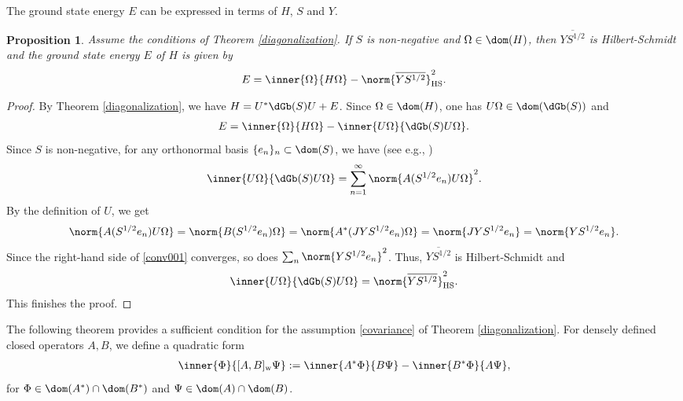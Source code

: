\documentclass[12pt,draft]{article}
\theoremstyle{plain}
\newtheorem{prop}[theorem]{\bf Proposition}
\numberwithin{equation}{section}
\theoremstyle{remark}
\begin{document}
The ground state energy $E$ can be expressed in terms of $H$, $S$ and $Y$.
\begin{prop}\label{gse1}
Assume the conditions of Theorem \ref{diagonalization}.
If $S$ is non-negative and $\Omega\in\dom(H)$, then $\overline{YS^{1/2}}$ is Hilbert-Schmidt and
the ground state energy $E$ of $H$ is given by 
 \begin{align*}
    E = \inner{\Omega}{H\Omega} - \norm{\overline{YS^{1/2}}}_\mathrm{HS}^2.
 \end{align*}
\end{prop}

\begin{proof}
By Theorem \ref{diagonalization}, we have $H=U^*\dGb(S)U+E$.
Since $\Omega\in\dom(H)$, one has $U\Omega \in\dom(\dGb(S))$ and 
\begin{align*}
 E = \inner{\Omega}{H\Omega} - \inner{U\Omega}{\dGb(S)U\Omega}.
\end{align*}
Since $S$ is non-negative, for any orthonormal basis $\{e_n\}_n\subset \dom(S)$, we have (see e.g., \cite[Theorem 5.21]{A18})
\begin{align}
 \inner{U\Omega}{\dGb(S)U\Omega} 
 = \sum_{n=1}^\infty \norm{A(S^{1/2}e_n)U\Omega}^2. \label{conv001}
\end{align}
By the definition of $U$, we get
\begin{align*}
 \norm{A(S^{1/2}e_n)U\Omega}
= \norm{B(S^{1/2}e_n)\Omega}
 = \norm{A^*(JYS^{1/2}e_n)\Omega}
 = \norm{JYS^{1/2}e_n}
= \norm{YS^{1/2}e_n}.
\end{align*}
Since the right-hand side of \eqref{conv001} converges, so does $\sum_{n}\norm{YS^{1/2}e_n}^2$.
Thus, $\overline{YS^{1/2}}$ is Hilbert-Schmidt and 
\begin{align*}
  \inner{U\Omega}{\dGb(S)U\Omega} = \norm{\overline{YS^{1/2}}}_\mathrm{HS}^2.
\end{align*}
This finishes the proof.
\end{proof}

The following theorem provides a sufficient condition for the assumption \eqref{covariance} of Theorem \ref{diagonalization}.
For densely defined closed operators $A,B$, we define a quadratic form
\begin{align*}
  \inner{\Phi}{[A,B]_\mathrm{w}\Psi}
 := \inner{A^*\Phi}{B\Psi}-\inner{B^*\Phi}{A\Psi}, 
\end{align*}
for $\Phi\in\dom(A^*)\cap \dom(B^*)$ and $\Psi\in\dom(A)\cap\dom(B)$.
\end{document}
